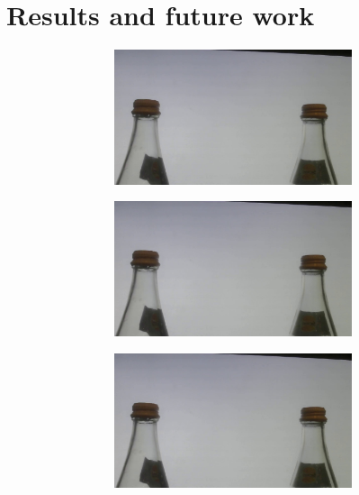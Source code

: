 \section{Results and future work}
\begin{figure}[!tbp]
    \begin{subfigure}[b]{\textwidth}%
        \begin{subfigure}[b]{0.180\textwidth}%
          \includegraphics[width=1\linewidth]{images/results/prestab-0.jpg}
        \end{subfigure}
        \begin{subfigure}[b]{0.180\textwidth}%
          \includegraphics[width=1\linewidth]{images/results/prestab-1.jpg}
        \end{subfigure}
        \begin{subfigure}[b]{0.180\textwidth}%
          \includegraphics[width=1\linewidth]{images/results/prestab-2.jpg}

\end{subfigure}
\end{subfigure}
\end{figure}
